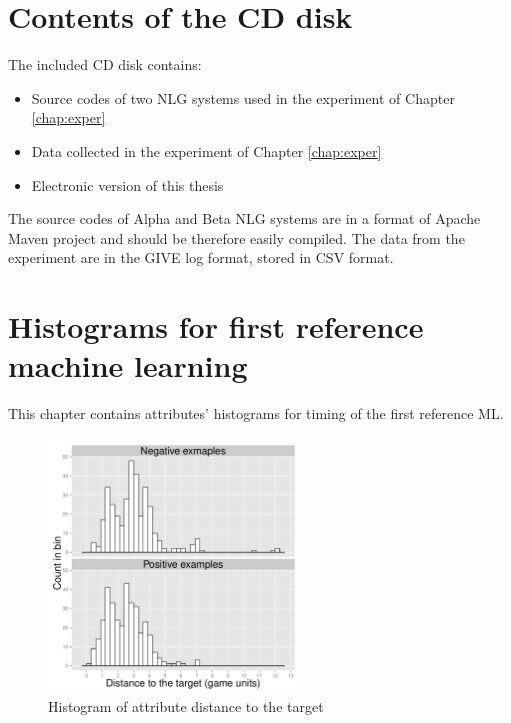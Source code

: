\chapter{Contents of the CD disk}
The included CD disk contains:
\begin{itemize}
\item
Source codes of two NLG systems used in the experiment of Chapter \ref{chap:exper}
\item
Data collected in the experiment of Chapter \ref{chap:exper}
\item
Electronic version of this thesis
\end{itemize}


The source codes of Alpha and Beta NLG systems are in a format of Apache Maven project and should be therefore easily compiled. The data from the experiment are in the GIVE log format, stored in CSV format.

\chapter{Histograms for first reference machine learning}
This chapter contains attributes' histograms for timing of the first reference ML.
\begin{figure}[!htbp]
  \centering
	\includegraphics[page=1,width=0.6\textwidth]{Images/fref_distrib}
	\caption{Histogram of attribute distance to the target}
	\label{fig:fref-distrib-dist}
\end{figure}


